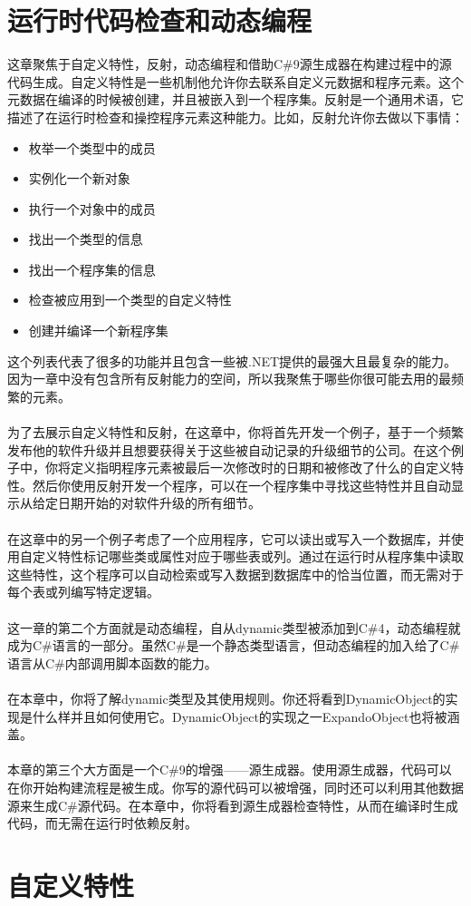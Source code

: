 \section{运行时代码检查和动态编程}
这章聚焦于自定义特性，反射，动态编程和借助C\#9源生成器在构建过程中的源代码生成。自定义特性是一些机制他允许你去联系自定义元数据和程序元素。这个元数据在编译的时候被创建，并且被嵌入到一个程序集。反射是一个通用术语，它描述了在运行时检查和操控程序元素这种能力。比如，反射允许你去做以下事情：
\begin{itemize}
\item 枚举一个类型中的成员
\item 实例化一个新对象
\item 执行一个对象中的成员
\item 找出一个类型的信息
\item 找出一个程序集的信息
\item 检查被应用到一个类型的自定义特性
\item 创建并编译一个新程序集
\end{itemize}
这个列表代表了很多的功能并且包含一些被.NET提供的最强大且最复杂的能力。因为一章中没有包含所有反射能力的空间，所以我聚焦于哪些你很可能去用的最频繁的元素。
\\ \\
为了去展示自定义特性和反射，在这章中，你将首先开发一个例子，基于一个频繁发布他的软件升级并且想要获得关于这些被自动记录的升级细节的公司。在这个例子中，你将定义指明程序元素被最后一次修改时的日期和被修改了什么的自定义特性。然后你使用反射开发一个程序，可以在一个程序集中寻找这些特性并且自动显示从给定日期开始的对软件升级的所有细节。
\\ \\
在这章中的另一个例子考虑了一个应用程序，它可以读出或写入一个数据库，并使用自定义特性标记哪些类或属性对应于哪些表或列。通过在运行时从程序集中读取这些特性，这个程序可以自动检索或写入数据到数据库中的恰当位置，而无需对于每个表或列编写特定逻辑。
\\ \\
这一章的第二个方面就是动态编程，自从dynamic类型被添加到C\#4，动态编程就成为C\#语言的一部分。虽然C\#是一个静态类型语言，但动态编程的加入给了C\#语言从C\#内部调用脚本函数的能力。
\\ \\
在本章中，你将了解dynamic类型及其使用规则。你还将看到DynamicObject的实现是什么样并且如何使用它。DynamicObject的实现之一ExpandoObject也将被涵盖。
\\ \\
本章的第三个大方面是一个C\#9的增强——源生成器。使用源生成器，代码可以在你开始构建流程是被生成。你写的源代码可以被增强，同时还可以利用其他数据源来生成C\#源代码。在本章中，你将看到源生成器检查特性，从而在编译时生成代码，而无需在运行时依赖反射。

\section{自定义特性}